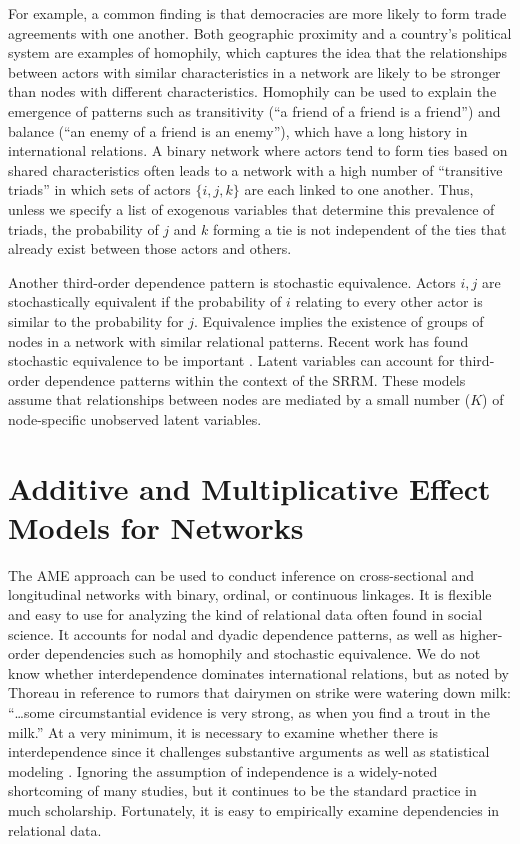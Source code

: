 \documentclass[12pt]{amsart}
\begin{document}
For example, a common finding is that democracies are more likely to form trade agreements with one another. Both geographic proximity and a country's political system are examples of homophily, which captures the idea that the relationships between actors with similar characteristics in a network are likely to be stronger than nodes with different characteristics. Homophily can be used to explain the emergence of patterns such as transitivity (``a friend of a friend is a friend'') and balance (``an enemy of a friend is an enemy''), which have a long history in international relations. A binary network where actors tend to form ties based on shared characteristics  often leads to a network with a high number of ``transitive triads'' in which  sets of actors $\{i,j,k\}$ are each linked to one another. Thus, unless we specify a list of exogenous variables that determine this prevalence of triads, the probability of $j$ and $k$ forming a tie is not independent of the ties that already exist between those actors and others.

Another third-order dependence pattern is stochastic equivalence. Actors $i,j$ are stochastically equivalent if the probability of $i$ relating to every other actor is similar to the probability for $j$. Equivalence implies the existence of groups of nodes in a network with similar relational patterns.  Recent work has found stochastic equivalence to be important \citep{manger:etal:2012}. Latent variables can account for third-order dependence patterns within the context of the SRRM. These models assume that relationships between nodes are mediated by a small number ($K$) of node-specific unobserved latent variables. 

\section{\textbf{Additive and Multiplicative Effect Models for Networks}}

The AME approach can be used to conduct inference on cross-sectional and longitudinal networks with binary, ordinal, or continuous linkages. It is flexible and easy to use for analyzing the kind of relational data often found in social science.  It accounts for nodal and dyadic dependence patterns, as well as higher-order dependencies such as homophily and stochastic equivalence.  We do not know whether interdependence dominates international relations, but as noted by Thoreau in reference to rumors that dairymen on strike were watering down milk: ``\ldots some circumstantial evidence is very strong, as when you find a trout in the milk.''  At a very minimum, it is necessary to examine whether there is interdependence since it challenges substantive arguments as well as statistical modeling \citep{snijders:2011}. Ignoring the assumption of independence is a widely-noted shortcoming of many studies, but it continues to be the standard practice in much scholarship. Fortunately, it is easy to empirically examine dependencies in relational data.
\end{document}

